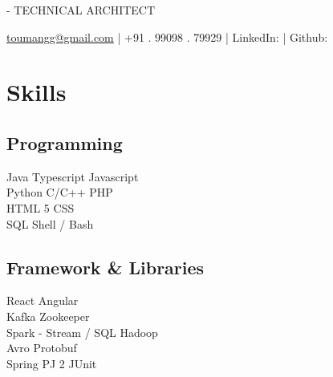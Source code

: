 \documentclass[]{main}
\begin{document}
\lastupdated

 { - TECHNICAL ARCHITECT}
{\href{mailto:toumangg@gmail.com}{toumangg@gmail.com}  |  +91 . 99098 . 79929  | 
LinkedIn: \href{https://www.linkedin.com/in/iumangg}{} | Github: \href{https://github.com/iumangg}{}

}


\begin{minipage}[t]{0.25\textwidth} 



\section{Skills}
\subsection{Programming}\sectionsep
\textbullet{} Java \textbullet{} Typescript \textbullet{} Javascript\\
\textbullet{} Python \textbullet{} C/C++ \textbullet{} PHP\\
\textbullet{} HTML 5 \textbullet{} CSS\\
\textbullet{} SQL \textbullet{} Shell / Bash

\sectionsep
\subsection{Framework \& Libraries}\sectionsep
\textbullet{} React \textbullet{} Angular\\
\textbullet{} Kafka \textbullet{} Zookeeper\\
\textbullet{} Spark - Stream / SQL \textbullet{} Hadoop\\
\textbullet{} Avro \textbullet{} Protobuf\\
\textbullet{} Spring \textbullet{} PJ 2 \textbullet{} JUnit
\sectionsep


\end{minipage}
\end{document}
